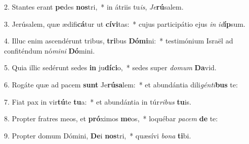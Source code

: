 2. Stantes erant \textbf{pe}des \textbf{nos}tri,~*  in átriis tu\textit{is}, \textit{Je}\textbf{rú}salem.\

3. Jerúsalem, quæ ædifi\textbf{cá}tur ut \textbf{cí}\textbf{vi}tas:~*  cujus participátio ejus \textit{in} \textit{id}\textbf{íp}sum.\

4. Illuc enim ascendérunt tribus, \textbf{tri}bus \textbf{Dó}\textbf{mi}ni:~*  testimónium Israël ad confiténdum nó\textit{mi}\textit{ni} \textbf{Dó}mini.\

5. Quia illic sedérunt sedes \textbf{in} ju\textbf{dí}\textbf{ci}o,~*  sedes super \textit{do}\textit{mum} \textbf{Da}vid.\

6. Rogáte quæ ad pacem \textbf{sunt} Je\textbf{rú}\textbf{sa}lem:~*  et abundántia dili\textit{gén}\textit{ti}\textbf{bus} te:\

7. Fiat pax in vir\textbf{tú}te \textbf{tu}a:~*  et abundántia in túr\textit{ri}\textit{bus} \textbf{tu}is.\

8. Propter fratres meos, et \textbf{pró}ximos \textbf{me}os,~*  loquébar \textit{pa}\textit{cem} \textbf{de} te:\

9. Propter domum Dómini, \textbf{De}i \textbf{nos}tri,~*  quæsívi \textit{bo}\textit{na} \textbf{ti}bi.\

